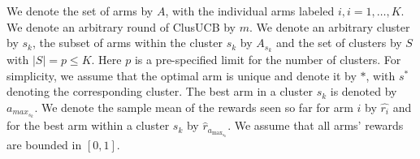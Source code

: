 We denote the set of arms by $A$, with the individual arms labeled $i, i=1,\ldots,K$.
We denote an arbitrary round of ClusUCB by $m$. We denote an arbitrary cluster by $s_{k}$, the subset of arms within the cluster $s_k$ by  $A_{s_{k}}$ and the set of clusters by $S$ with $|S|=p\leq K$. 
Here $p$ is a pre-specified limit for the number of clusters.
For simplicity, we assume that the optimal arm is unique and denote it by ${*}$, with $s^{*}$ denoting the corresponding cluster.
The best arm in a cluster $s_{k}$ is denoted by $a_{max_{s_{k}}}$.  
We denote the sample mean of the rewards seen so far for arm $i$ by $\hat{r_i}$ and for the best arm within a cluster $s_k$ by $\hat{r}_{a_{\max_{s_{k}}}}$. 
We assume that all arms' rewards are bounded in $[0,1]$.


